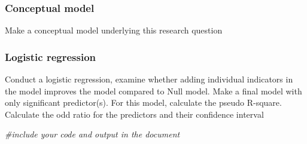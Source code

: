 \documentclass[]{article}
\newenvironment{Shaded}{\begin{snugshade}}{\end{snugshade}}
\newcommand{\KeywordTok}[1]{\textcolor[rgb]{0.13,0.29,0.53}{\textbf{#1}}}
\newcommand{\DataTypeTok}[1]{\textcolor[rgb]{0.13,0.29,0.53}{#1}}
\newcommand{\DecValTok}[1]{\textcolor[rgb]{0.00,0.00,0.81}{#1}}
\newcommand{\StringTok}[1]{\textcolor[rgb]{0.31,0.60,0.02}{#1}}
\newcommand{\CommentTok}[1]{\textcolor[rgb]{0.56,0.35,0.01}{\textit{#1}}}
\newcommand{\OtherTok}[1]{\textcolor[rgb]{0.56,0.35,0.01}{#1}}
\newcommand{\OperatorTok}[1]{\textcolor[rgb]{0.81,0.36,0.00}{\textbf{#1}}}
\newcommand{\NormalTok}[1]{#1}
\begin{document}
\begin{Shaded}
\end{Shaded}

\subsubsection{Conceptual model}\label{conceptual-model-3}

Make a conceptual model underlying this research question

\subsubsection{Logistic regression}\label{logistic-regression}

Conduct a logistic regression, examine whether adding individual
indicators in the model improves the model compared to Null model. Make
a final model with only significant predictor(s). For this model,
calculate the pseudo R-square. Calculate the odd ratio for the
predictors and their confidence interval

\begin{Shaded}
\begin{Highlighting}[]
\CommentTok{#include your code and output in the document}
\end{Highlighting}
\end{Shaded}
\end{document}

